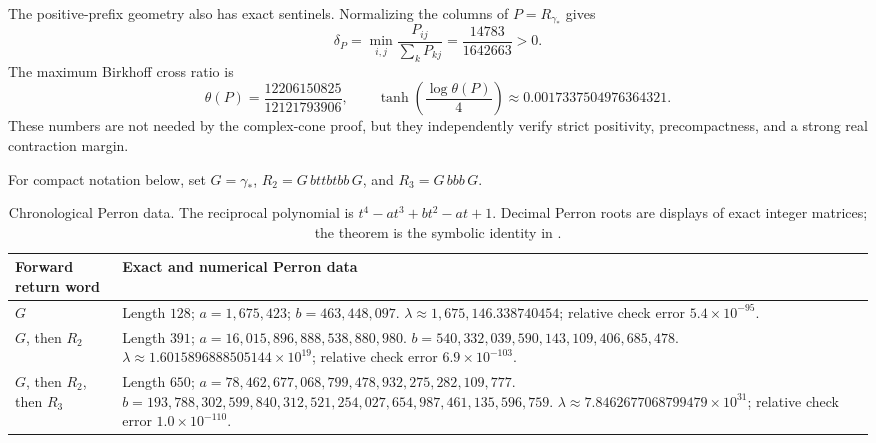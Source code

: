 The positive-prefix geometry also has exact sentinels.  Normalizing the
columns of \(P=R_{\gamma_*}\) gives
\begin{equation}
 \delta_P
 =\min_{i,j}\frac{P_{ij}}{\sum_kP_{kj}}
 =\frac{14783}{1642663}>0.
 \label{eq:delta-prefix}
\end{equation}
The maximum Birkhoff cross ratio is
\begin{equation}
 \theta(P)
 =\frac{12206150825}{12121793906},
 \qquad
 \tanh\!\left(\frac{\log\theta(P)}4\right)
 \approx0.0017337504976364321.
 \label{eq:birkhoff-prefix}
\end{equation}
These numbers are not needed by the complex-cone proof, but they independently
verify strict positivity, precompactness, and a strong real contraction
margin.

For compact notation below, set
\(G=\gamma_*\), \(R_2=G\,bttbtbb\,G\), and \(R_3=G\,bbb\,G\).

\begin{table}[t]
\centering
\caption{Chronological Perron data.  The reciprocal polynomial is
\(t^4-at^3+bt^2-at+1\).  Decimal Perron roots are displays of exact integer
matrices; the theorem is the symbolic identity in
.}
\label{tab:perron-certificate}
\small
\begin{tabularx}{\textwidth}{@{}p{}>{\raggedright\arraybackslash}X@{}}
\toprule
Forward return word & Exact and numerical Perron data \\
\midrule
\(G\) &
Length \(128\); \(a=1{,}675{,}423\); \(b=463{,}448{,}097\).\newline
\(\lambda\approx1{,}675{,}146.338740454\); relative check error
\(5.4\!\times\!10^{-95}\). \\
\(G\), then \(R_2\) &
Length \(391\); \(a=16{,}015{,}896{,}888{,}538{,}880{,}980\).\newline
\(b=540{,}332{,}039{,}590{,}143{,}109{,}406{,}685{,}478\).\newline
\(\lambda\approx1.6015896888505144\!\times\!10^{19}\); relative check
error \(6.9\!\times\!10^{-103}\). \\
\(G\), then \(R_2\), then \(R_3\) &
Length \(650\); \(a=78{,}462{,}677{,}068{,}799{,}478{,}932{,}275{,}282{,}109{,}777\).\newline
\(b=193{,}788{,}302{,}599{,}840{,}312{,}521{,}254{,}027{,}654{,}987{,}461{,}135{,}596{,}759\).\newline
\(\lambda\approx7.8462677068799479\!\times\!10^{31}\); relative check
error \(1.0\!\times\!10^{-110}\). \\
\bottomrule
\end{tabularx}
\end{table}

